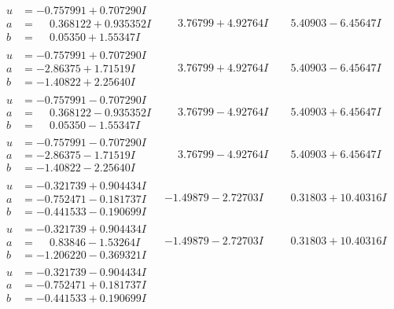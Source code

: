 \documentclass[1p]{elsarticle_modified}
\theoremstyle{definition}
\begin{document}
$$\begin{array}{c|c|c}
\begin{aligned}
u &= -0.757991 + 0.707290 I \\
a &= \phantom{-}0.368122 + 0.935352 I \\
b &= \phantom{-}0.05350 + 1.55347 I\end{aligned}
 & \phantom{-}3.76799 + 4.92764 I & \phantom{-}5.40903 - 6.45647 I \\ \hline\begin{aligned}
u &= -0.757991 + 0.707290 I \\
a &= -2.86375 + 1.71519 I \\
b &= -1.40822 + 2.25640 I\end{aligned}
 & \phantom{-}3.76799 + 4.92764 I & \phantom{-}5.40903 - 6.45647 I \\ \hline\begin{aligned}
u &= -0.757991 - 0.707290 I \\
a &= \phantom{-}0.368122 - 0.935352 I \\
b &= \phantom{-}0.05350 - 1.55347 I\end{aligned}
 & \phantom{-}3.76799 - 4.92764 I & \phantom{-}5.40903 + 6.45647 I \\ \hline\begin{aligned}
u &= -0.757991 - 0.707290 I \\
a &= -2.86375 - 1.71519 I \\
b &= -1.40822 - 2.25640 I\end{aligned}
 & \phantom{-}3.76799 - 4.92764 I & \phantom{-}5.40903 + 6.45647 I \\ \hline\begin{aligned}
u &= -0.321739 + 0.904434 I \\
a &= -0.752471 - 0.181737 I \\
b &= -0.441533 - 0.190699 I\end{aligned}
 & -1.49879 - 2.72703 I & \phantom{-}0.31803 + 10.40316 I \\ \hline\begin{aligned}
u &= -0.321739 + 0.904434 I \\
a &= \phantom{-}0.83846 - 1.53264 I \\
b &= -1.206220 - 0.369321 I\end{aligned}
 & -1.49879 - 2.72703 I & \phantom{-}0.31803 + 10.40316 I \\ \hline\begin{aligned}
u &= -0.321739 - 0.904434 I \\
a &= -0.752471 + 0.181737 I \\
b &= -0.441533 + 0.190699 I\end{aligned}

\end{array}$$
\end{document}
